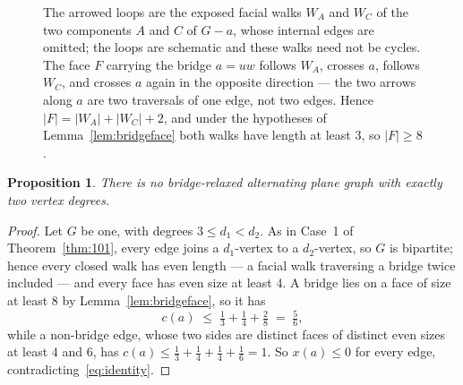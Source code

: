 \documentclass{baustms}
\theoremstyle{cupthm}
\newtheorem{proposition}[theorem]{Proposition}
\theoremstyle{cupdefn}
\theoremstyle{cuprem}
\begin{document}
\begin{figure}[ht]
\centering
{}
\caption{The arrowed loops are the exposed facial walks $W_A$ and $W_C$ of the
two components $A$ and $C$ of $G-a$, whose internal edges are omitted; the loops
are schematic and these walks need not be cycles. The face $F$ carrying the bridge $a=uw$ follows $W_A$,
crosses $a$, follows $W_C$, and crosses $a$ again in the opposite direction ---
the two arrows along $a$ are two traversals of one edge, not two edges. Hence
$|F| = |W_A| + |W_C| + 2$, and under the hypotheses of
Lemma~\ref{lem:bridgeface} both walks have length at least $3$, so
$|F| \ge 8$.}\label{fig:bridge}
\end{figure}

\begin{proposition}\label{prop:twoY-weak}
There is no bridge-relaxed alternating plane graph with exactly two vertex
degrees.
\end{proposition}

\begin{proof}
Let $G$ be one, with degrees $3 \le d_1 < d_2$. As in Case~1 of
Theorem~\ref{thm:101}, every edge joins a $d_1$-vertex to a $d_2$-vertex, so $G$
is bipartite; hence every closed walk has even length --- a facial walk
traversing a bridge twice included --- and every face has even size at least $4$.
A bridge lies on a face of size at least $8$ by Lemma~\ref{lem:bridgeface}, so it
has
\[
  c(a) \;\le\; \tfrac13 + \tfrac14 + \tfrac28 \;=\; \tfrac56 ,
\]
while a non-bridge edge, whose two sides are distinct faces of distinct even
sizes at least $4$ and $6$, has
$c(a) \le \tfrac13+\tfrac14+\tfrac14+\tfrac16 = 1$. So $x(a) \le 0$ for every
edge, contradicting~\eqref{eq:identity}.
\end{proof}
\end{document}
